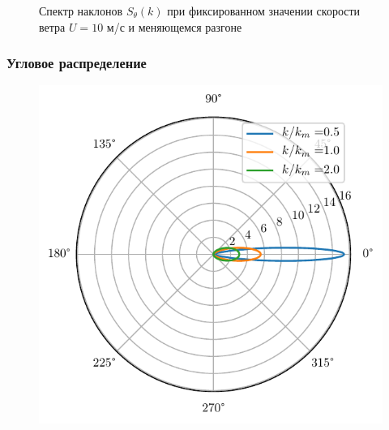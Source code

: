 \documentclass[10pt,pdf,hyperref={unicode}, dvipsnames]{beamer}
\begin{document}
\begin{frame}[t]
\begin{figure}[h!]
\begin{minipage}{0.49\linewidth}
			\caption{Спектр наклонов $S_{\theta}(k)$ при фиксированном значении скорости ветра 
			$U=10$ м/с и меняющемся разгоне}		
			\label{fig:full_spectrum4}
	\end{minipage}
\end{figure}

\end{frame}


\begin{frame}[t]

	\frametitle{Угловое распределение}
\begin{figure}[h!]


	\begin{minipage}{0.49\linewidth}
			\centering
			\includegraphics[width=\linewidth]{fig/full_angles1.pdf}	
	\end{minipage}
	\hfill
	\begin{minipage}{0.49\linewidth}
			\centering

\end{minipage}
\end{figure}
\end{frame}
\end{document}
